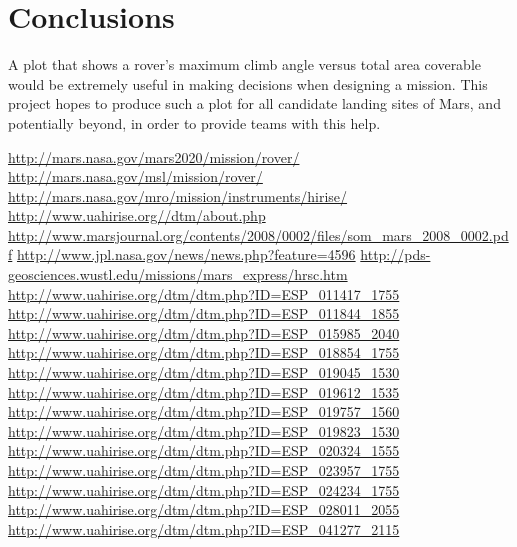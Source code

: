 \documentclass[12pt]{article}
\begin{document}
\section{Conclusions}
\label{sec:conclusions}
A plot that shows a rover's maximum climb angle versus total area coverable would be extremely useful in making decisions when designing a mission. This project hopes to produce such a plot for all candidate landing sites of Mars, and potentially beyond, in order to provide teams with this help.

\begin{thebibliography}{30}
  \url{http://mars.nasa.gov/mars2020/mission/rover/}
  \url{http://mars.nasa.gov/msl/mission/rover/}
  \url{http://mars.nasa.gov/mro/mission/instruments/hirise/}
  \url{http://www.uahirise.org//dtm/about.php}
  \url{http://www.marsjournal.org/contents/2008/0002/files/som_mars_2008_0002.pdf}
  \url{http://www.jpl.nasa.gov/news/news.php?feature=4596}
  \url{http://pds-geosciences.wustl.edu/missions/mars_express/hrsc.htm}
  \url{http://www.uahirise.org/dtm/dtm.php?ID=ESP_011417_1755}
  \url{http://www.uahirise.org/dtm/dtm.php?ID=ESP_011844_1855}
  \url{http://www.uahirise.org/dtm/dtm.php?ID=ESP_015985_2040}
  \url{http://www.uahirise.org/dtm/dtm.php?ID=ESP_018854_1755}
  \url{http://www.uahirise.org/dtm/dtm.php?ID=ESP_019045_1530}
  \url{http://www.uahirise.org/dtm/dtm.php?ID=ESP_019612_1535}
  \url{http://www.uahirise.org/dtm/dtm.php?ID=ESP_019757_1560}
  \url{http://www.uahirise.org/dtm/dtm.php?ID=ESP_019823_1530}
  \url{http://www.uahirise.org/dtm/dtm.php?ID=ESP_020324_1555}
  \url{http://www.uahirise.org/dtm/dtm.php?ID=ESP_023957_1755}
  \url{http://www.uahirise.org/dtm/dtm.php?ID=ESP_024234_1755}
  \url{http://www.uahirise.org/dtm/dtm.php?ID=ESP_028011_2055}
  \url{http://www.uahirise.org/dtm/dtm.php?ID=ESP_041277_2115}
\end{thebibliography}
\end{document}
